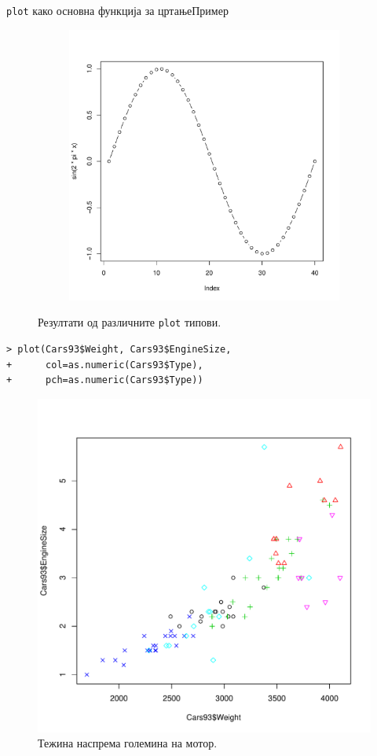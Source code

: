 \documentclass[hyperref={unicode}, xcolor={svgnames, table},
usepdftitle=false]{beamer}
\theoremstyle{remark}
\begin{document}
\begin{frame}[fragile]{\texttt{plot} како основна функција за
    цртање}{Пример}
\begin{figure}
\begin{subfigure}[b]{.3\linewidth}
  \end{subfigure}
  \begin{subfigure}[b]{.3\linewidth}
    \includegraphics[width=\textwidth]{Plot_Both_Sine.pdf}
  \end{subfigure}
  \caption{Резултати од различните \texttt{plot} типови.}
\end{figure}
\end{frame}

\begin{frame}[fragile]
\begin{verbatim}
> plot(Cars93$Weight, Cars93$EngineSize,
+      col=as.numeric(Cars93$Type),
+      pch=as.numeric(Cars93$Type))
\end{verbatim}
\begin{figure}
  \centering
  \includegraphics[width=.5\textwidth]{Plot_Cars.pdf}
  \caption{Тежина наспрема големина на мотор.}
\end{figure}
\end{frame}
\end{document}
